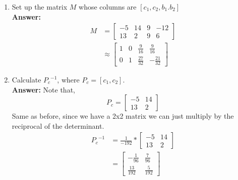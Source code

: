 \documentclass{amsart}
\begin{document}
\begin{enumerate}
\item Set up the matrix $M$ whose columns are $[c_1,c_2,b_1.b_2]$\\
\noindent \textbf{Answer: }
\begin{align*}
M &=
\begin{bmatrix}
-5&14&9&-12\\
13&2&9&6
\end{bmatrix}\\
&\approx
\begin{bmatrix}1&0&\frac{9}{16}&\frac{9}{16}\\ 0&1&\frac{27}{32}&-\frac{21}{32}\end{bmatrix}
\end{align*}
\vspace{.1in}

\item Calculate ${P_c}^{-1}$, where  ${P_c} = [c_1,c_2].$\\
\noindent \textbf{Answer: } Note that,
\begin{equation*}
{P_c} = 
\begin{bmatrix}
-5&14\\
13&2
\end{bmatrix}
\end{equation*}
Same as before, since we have a 2x2 matrix we can just multiply by the reciprocal of the determinant.
\begin{align*}
{P_c}^{-1} &= \frac{1}{-192} 
*
\begin{bmatrix}
-5&14\\
13&2
\end{bmatrix}\\
&=
\begin{bmatrix}-\frac{1}{96}&\frac{7}{96}\\ \frac{13}{192}&\frac{5}{192}\end{bmatrix}
\end{align*}
\vspace{.1in}


\end{enumerate}
\end{document}
